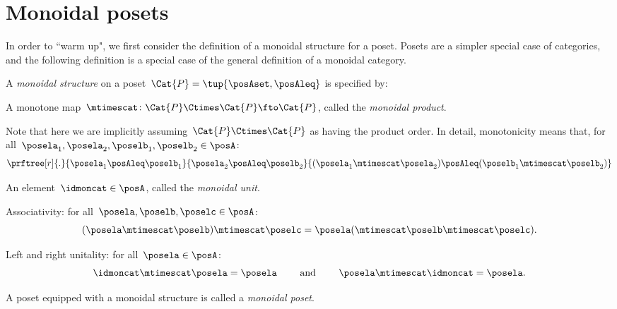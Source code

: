 

\section{Monoidal posets}




In order to ``warm up", we first consider the definition of a monoidal structure for a poset.
Posets are a simpler special case of categories, and the following definition is a special case of the general definition of a monoidal category.

\begin{ctdefinition}
    \label{def:monoidal-poset}
    A \emph{monoidal structure} on a poset~$\Cat{P} = \tup{\posAset, \posAleq}$ is specified by:
    
    \constit
    \begin{compactenum}
        \item A monotone map~$\mtimescat \colon \Cat{P} \Ctimes \Cat{P} \fto \Cat{P}$, called the \emph{monoidal product}.
        
        \noindent
        Note that here we are implicitly assuming~$\Cat{P} \Ctimes \Cat{P}$ as having the product order.
        In detail, monotonicity means that, for all~$\posela_1, \posela_2, \poselb_1, \poselb_2 \in \posA$:
        \begin{equation}
            \prftree[r]{.}
            {\posela_1 \posAleq \poselb_1}{\posela_2 \posAleq \poselb_2}{ (\posela_1 \mtimescat  \posela_2) \posAleq  (\poselb_1 \mtimescat  \poselb_2)}
        \end{equation}
        \item An element~$\idmoncat \in \posA$, called the \emph{monoidal unit}.
    \end{compactenum}
    
    \condit
    \begin{compactenum}
        \item Associativity: for all~$\posela, \poselb, \poselc \in \posA$:
        \begin{equation}
        (\posela \mtimescat \poselb)
            \mtimescat \poselc =  \posela ( \mtimescat \poselb \mtimescat \poselc).
        \end{equation}
        \item Left and right unitality: for all~$\posela \in \posA$:
        \begin{equation}
            \idmoncat \mtimescat \posela = \posela \quad \quad \text{ and } \quad \quad \posela \mtimescat \idmoncat = \posela.
        \end{equation}
    \end{compactenum}
    
    \noindent A poset equipped with a monoidal structure is called a \emph{monoidal poset}.
\end{ctdefinition}

